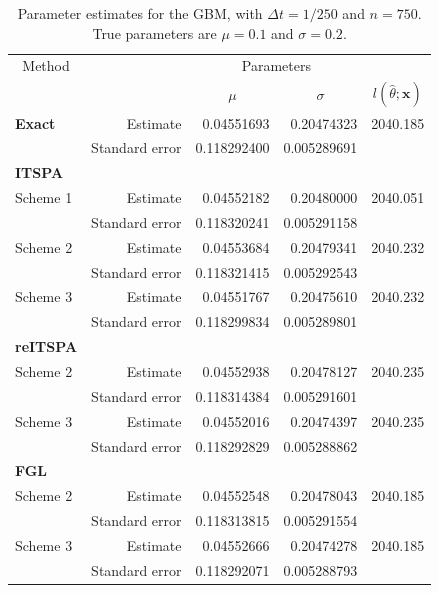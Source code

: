 \begin{table}
	\newcommand{\ra}[1]{\renewcommand{\arraystretch}{#1}}
	\ra{1.3}
	\centering
	\begin{tabular}{@{}lrrrr@{}}
		\toprule
		\multicolumn{1}{c}{Method}& & \multicolumn{2}{c}{Parameters}\\
		\cmidrule{1-1} \cmidrule{3-4}
		& & \multicolumn{1}{c}{$\mu$} & \multicolumn{1}{c}{$\sigma$} &\multicolumn{1}{c}{$l(\hat{\theta};\mathbf{x})$} \\
		\midrule
		\textbf{Exact}& Estimate & 0.04551693 & 0.20474323& 2040.185  \\
		& Standard error & 0.118292400 &0.005289691 & \\
		\textbf{ITSPA}\\
		Scheme 1& Estimate & 0.04552182  & 0.20480000  &2040.051 \\
		& Standard error & 0.118320241& 0.005291158& \\
		Scheme 2& Estimate &  0.04553684 &  0.20479341 & 2040.232\\
		& Standard error & 0.118321415& 0.005292543& \\
		Scheme 3& Estimate & 0.04551767  &  0.20475610 & 2040.232 \\
		& Standard error & 0.118299834& 0.005289801&  \\
		\textbf{reITSPA}\\
		Scheme 2& Estimate &   0.04552938&  0.20478127 & 2040.235 \\
		& Standard error & 0.118314384& 0.005291601&  \\
		Scheme 3& Estimate &  0.04552016 & 0.20474397  & 2040.235 \\
		& Standard error &  0.118292829& 0.005288862&  \\
		\textbf{FGL}\\
		Scheme 2& Estimate & 0.04552548 & 0.20478043 & 2040.185 \\
		&	Standard error &0.118313815 & 0.005291554 \\
		Scheme 3& Estimate & 0.04552666 & 0.20474278 & 2040.185 \\
		&	Standard error&	0.118292071 & 0.005288793\\
		\bottomrule
	\end{tabular}
	\caption[Parameter estimates: geometric Brownian motion] {Parameter estimates for the GBM, with $\Delta t=1/250$ and $n=750$.
		True parameters are $\mu=0.1$ and $\sigma=0.2$.}
	\label{Chap6.2 GBM table}
\end{table}

